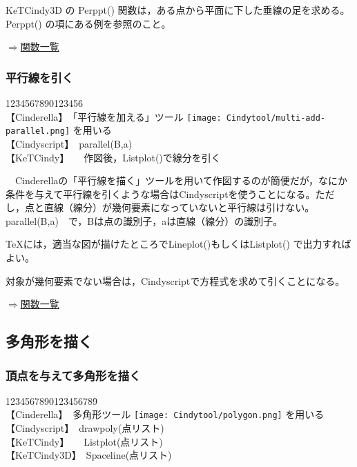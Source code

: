 \documentclass[papersize,a4paper,12pt,uplatex]{jsarticle}
\begin{document}
KeTCindy3D の Perppt() 関数は，ある点から平面に下した垂線の足を求める。Perppt() の項にある例を参照のこと。
\begin{flushright} \hyperlink{functionlist3d}{$\Rightarrow$関数一覧}\end{flushright}


\subsubsection{平行線を引く}

\begin{tabbing}
12\=34567890123456\=\kill\\

\>【Cinderella】　\>「平行線を加える」ツール \texttt{[image: Cindytool/multi-add-parallel.png]} を用いる　\\ 
\>【Cindyscript】　\>parallel(B,a)\\
 \>【KeTCindy】　　\>作図後，Listplot()で線分を引く\\
\end{tabbing}
　Cinderellaの「平行線を描く」ツールを用いて作図するのが簡便だが，なにか条件を与えて平行線を引くような場合はCindyscriptを使うことになる。ただし，点と直線（線分）が幾何要素になっていないと平行線は引けない。parallel(B,a)　で，Bは点の識別子，aは直線（線分）の識別子。

TeXには，適当な図が描けたところでLineplot()もしくはListplot() で出力すればよい。

対象が幾何要素でない場合は，Cindyscriptで方程式を求めて引くことになる。
\begin{flushright} \hyperlink{functionlist3d}{$\Rightarrow$関数一覧}\end{flushright}

\subsection{多角形を描く}

\subsubsection{頂点を与えて多角形を描く}

\begin{tabbing}
12\=34567890123456789\=\kill\\

 \>【Cinderella】　\>多角形ツール \texttt{[image: Cindytool/polygon.png]} を用いる　\\ 
 \>【Cindyscript】　\>drawpoly(点リスト)\\
 \>【KeTCindy】　　\>Listplot(点リスト)\\
 \>【KeTCindy3D】　\>Spaceline(点リスト)\\
\end{tabbing}
\end{document}
